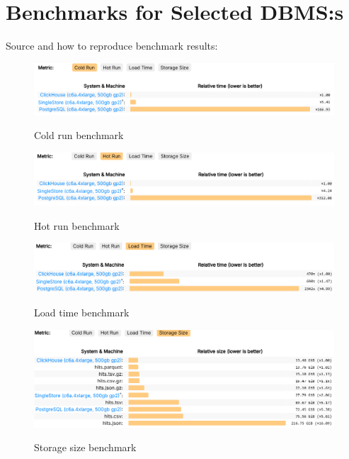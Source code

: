 \section{Benchmarks for Selected DBMS:s} \label{sec:benchmarks}
Source and how to reproduce benchmark results: \cite{benchmark}
\begin{figure}[h] %
    \centering
    \includegraphics[width=1.0\textwidth]{Figures/Q7_bench_crun.PNG}
    \label{fig:Cold run benchmark}
    \caption{Cold run benchmark} %
\end{figure}

\begin{figure}[h] %
    \centering
    \includegraphics[width=1.0\textwidth]{Figures/Q7_bench_hrun.PNG}
    \label{fig:Hot run benchmark}
    \caption{Hot run benchmark} %
\end{figure}


\begin{figure}[h] %
    \centering
    \includegraphics[width=1.0\textwidth]{Figures/Q7_bench_loadT.PNG}
    \label{fig:Load time benchmark}
    \caption{Load time benchmark} %
\end{figure}


\begin{figure}[h] %
    \centering
    \includegraphics[width=1.0\textwidth]{Figures/Q7_bench_storageS.PNG}
    \label{fig:Storage size benchmark}
    \caption{Storage size benchmark} %
\end{figure}

